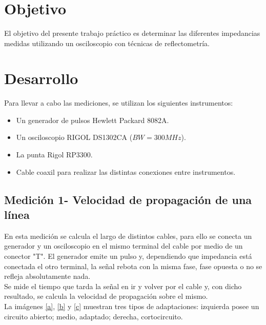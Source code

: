 \documentclass[a4paper,10pt]{article}
\title{  }
\begin{document}
	\maketitle %
	\newpage

	\tableofcontents %
	\newpage


	\section{Objetivo}
	
	\indent	El objetivo del presente trabajo práctico es determinar las 
	diferentes impedancias medidas utilizando un osciloscopio con técnicas de 
	reflectometría.
	
	\newpage
	\section{Desarrollo}
\indent Para llevar a cabo las mediciones, se utilizan los siguientes
		instrumentos:
		\begin{itemize}
			\item Un generador de pulsos Hewlett Packard 8082A.
			\item Un osciloscopio RIGOL DS1302CA ($BW=300MHz$).
			\item La punta Rigol RP3300.
			\item Cable coaxil para realizar las distintas conexiones entre 
			instrumentos.
		\end{itemize}	
	
		\subsection{Medici\'on 1- Velocidad de propagaci\'on de una l\'inea}
		\indent En esta medición se calcula el largo de distintos cables, para ello
		se conecta un generador y un osciloscopio en el mismo terminal del cable por medio de un conector "T". El
		generador emite un pulso y, dependiendo que impedancia está conectada el 
		otro terminal, la señal rebota con la misma fase, fase opuesta o no se 
		refleja absolutamente nada. \\
		\indent Se mide el tiempo que tarda la señal en ir y volver por el cable y,
		con dicho resultado, se calcula la velocidad de propagación sobre el mismo.
		\\
		\indent La imágenes \ref{a}, \ref{b} y \ref{c} muestran tres
		tipos de adaptaciones: izquierda posee un circuito abierto; medio, adaptado;
		derecha, cortocircuito. \\
	
\end{document}
